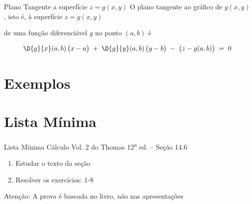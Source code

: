 \documentclass[fleqn,utf8,aspectratio=169,12pt]{beamer}
\begin{document}
\begin{frame}{Plano Tangente a superfície $z=g(x, y)$}
  O plano tangente ao gráfico de $g(x, y)$,
  \pause
  isto é, à superfície \(z=g(x, y)\)

  \pause
  de uma função diferenciável $g$
  \pause
  no ponto \((a, b)\) é

  \pause
  \[
    \D{g}{x}(a, b) \, \big(x-a\big) \;+\;
    \D{g}{y}(a, b) \, \big(y-b\big) \;-\;
    \big(z-g(a, b)\big) \;=\; 0
  \]
\end{frame}

\section{Exemplos}




\section{Lista Mínima}

\begin{frame}{Lista Mínima}
  Cálculo Vol. 2 do Thomas 12\textsuperscript{a} ed. -- Seção 14.6
  \begin{enumerate}
    \item Estudar o texto da seção
    \item Resolver os exercícios: 1-8
  \end{enumerate}

  \vfill
  Atenção: A prova é baseada no livro, não nas apresentações
\end{frame}

\end{document}
